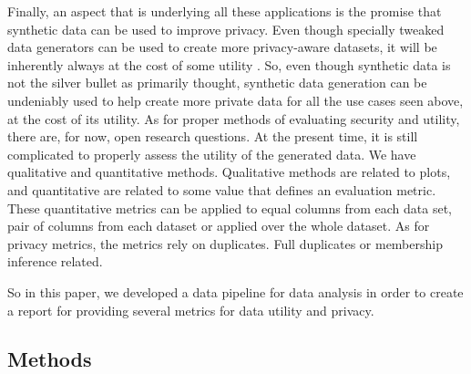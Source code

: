 Finally, an aspect that is underlying all these applications is the promise that synthetic data can be used to improve privacy. Even though specially tweaked data generators can be used to create more privacy-aware datasets, it will be inherently always at the cost of some utility \cite{stadler_synthetic_2020}. So, even though synthetic data is not the silver bullet as primarily thought, synthetic data generation can be undeniably used to help create more private data for all the use cases seen above, at the cost of its utility. As for proper methods of evaluating security and utility, there are, for now, open research questions. At the present time, it is still complicated to properly assess the utility of the generated data. We have qualitative and quantitative methods. Qualitative methods are related to plots, and quantitative are related to some value that defines an evaluation metric. These quantitative metrics can be applied to equal columns from each data set, pair of columns from each dataset or applied over the whole dataset. As for privacy metrics, the metrics rely on duplicates. Full duplicates or membership inference related. 

So in this paper, we developed a data pipeline for data analysis in order to create a report for providing several metrics for data utility and privacy.


\subsection{Methods}

